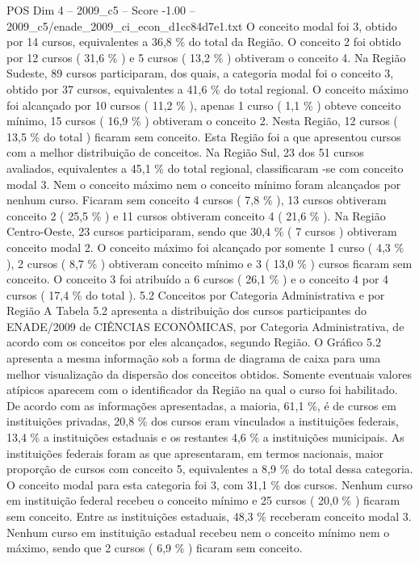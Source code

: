 \begin{textsample}{POS Dim 4 – 2009\_c5 – Score -1.00 – 2009\_c5/enade\_2009\_ci\_econ\_d1cc84d7e1.txt}
O conceito modal foi 3, obtido por 14 cursos, equivalentes a 36,8 \% do total da Região.
O conceito 2 foi obtido por 12 cursos ( 31,6 \% ) e 5 cursos ( 13,2 \% ) obtiveram o conceito 4.
Na Região Sudeste, 89 cursos participaram, dos quais, a categoria modal foi o conceito 3, obtido por 37 cursos, equivalentes a 41,6 \% do total regional.
O conceito máximo foi alcançado por 10 cursos ( 11,2 \% ), apenas 1 curso ( 1,1 \% ) obteve conceito mínimo, 15 cursos ( 16,9 \% ) obtiveram o conceito 2.
Nesta Região, 12 cursos ( 13,5 \% do total ) ficaram sem conceito.
Esta Região foi a que apresentou cursos com a melhor distribuição de conceitos.
Na Região Sul, 23 dos 51 cursos avaliados, equivalentes a 45,1 \% do total regional, classificaram -se com conceito modal 3.
Nem o conceito máximo nem o conceito mínimo foram alcançados por nenhum curso.
Ficaram sem conceito 4 cursos ( 7,8 \% ), 13 cursos obtiveram conceito 2 ( 25,5 \% ) e 11 cursos obtiveram conceito 4 ( 21,6 \% ).
Na Região Centro-Oeste, 23 cursos participaram, sendo que 30,4 \% ( 7 cursos ) obtiveram conceito modal 2.
O conceito máximo foi alcançado por somente 1 curso ( 4,3 \% ), 2 cursos ( 8,7 \% ) obtiveram conceito mínimo e 3 ( 13,0 \% ) cursos ficaram sem conceito.
O conceito 3 foi atribuído a 6 cursos ( 26,1 \% ) e o conceito 4 por 4 cursos ( 17,4 \% do total ). 5.2 Conceitos por Categoria Administrativa e por Região A Tabela 5.2 apresenta a distribuição dos cursos participantes do ENADE/2009 de CIÊNCIAS ECONÔMICAS, por Categoria Administrativa, de acordo com os conceitos por eles alcançados, segundo Região.
O Gráfico 5.2 apresenta a mesma informação sob a forma de diagrama de caixa para uma melhor visualização da dispersão dos conceitos obtidos.
Somente eventuais valores atípicos aparecem com o identificador da Região na qual o curso foi habilitado.
De acordo com as informações apresentadas, a maioria, 61,1 \%, é de cursos em instituições privadas, 20,8 \% dos cursos eram vinculados a instituições federais, 13,4 \% a instituições estaduais e os restantes 4,6 \% a instituições municipais.
As instituições federais foram as que apresentaram, em termos nacionais, maior proporção de cursos com conceito 5, equivalentes a 8,9 \% do total dessa categoria.
O conceito modal para esta categoria foi 3, com 31,1 \% dos cursos.
Nenhum curso em instituição federal recebeu o conceito mínimo e 25 cursos ( 20,0 \% ) ficaram sem conceito.
Entre as instituições estaduais, 48,3 \% receberam conceito modal 3.
Nenhum curso em instituição estadual recebeu nem o conceito mínimo nem o máximo, sendo que 2 cursos ( 6,9 \% ) ficaram sem conceito.

\end{textsample}

